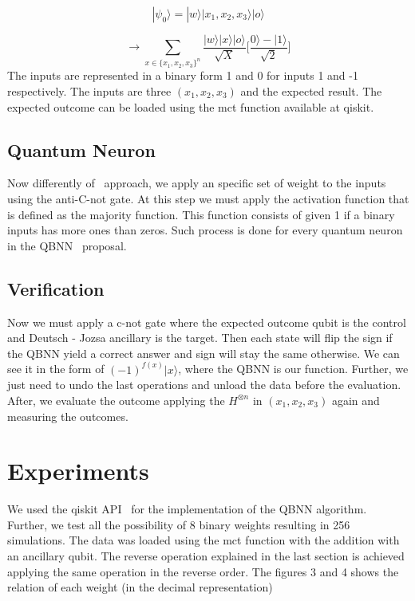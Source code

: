 \documentclass[conference]{IEEEtran}
\begin{document}
  \begin{equation}
          |\psi_0\rangle = |w\rangle|x_1, x_2, x_3\rangle|o\rangle
  \end{equation}

  \begin{equation}
          \rightarrow \sum_{x \in \{x_1, x_2, x_3\}^n}
          \frac{|w\rangle|x\rangle|o\rangle}{\sqrt{X}}\Bigg[\frac{0\rangle - |1\rangle}{\sqrt{2}}\Bigg]
  \end{equation}
  The inputs are represented in a binary form 1 and 0 for inputs 1 and -1 respectively.
  The inputs are three  $(x_1, x_2, x_3)$ and the expected result.
  The expected outcome can be loaded using the mct function available at qiskit.

\subsection{Quantum Neuron}\label{subsec:quantum-neuron}
  Now differently of~\cite{fawaz2019training} approach, we apply an specific set of weight to the inputs using the
  anti-C-not gate.
  At this step we must apply the activation function that is defined as the majority function.
 This function consists of given 1 if a binary inputs has more ones than zeros.
  Such process is done for every quantum neuron in the QBNN~\cite{fawaz2019training} proposal.

\subsection{Verification}\label{subsec:verification}
  Now we must apply a c-not gate where the expected outcome qubit is the control and Deutsch - Jozsa ancillary is the target.
 Then each state will flip the sign if the QBNN yield a correct answer and sign will stay the same otherwise.
 We can see it in the form of \((-1)^{f(x)}|x\rangle\), where the QBNN is our function.
 Further, we just need to undo the last operations and unload the data before the evaluation.
 After, we evaluate the outcome applying the $H^{\otimes n}$ in $(x_1, x_2, x_3)$ again and measuring the outcomes.



\section{Experiments}\label{sec:experiments}

    We used the qiskit API~\cite{Qiskit} for the implementation of the QBNN algorithm.
    Further, we test all the possibility of 8 binary weights resulting in 256 simulations.
    The data was loaded using the mct function with the addition with an ancillary qubit.
    The reverse operation explained in the last section is achieved applying the same operation in the reverse order.
    The figures 3 and 4 shows the relation of each weight (in the decimal representation)
\end{document}
